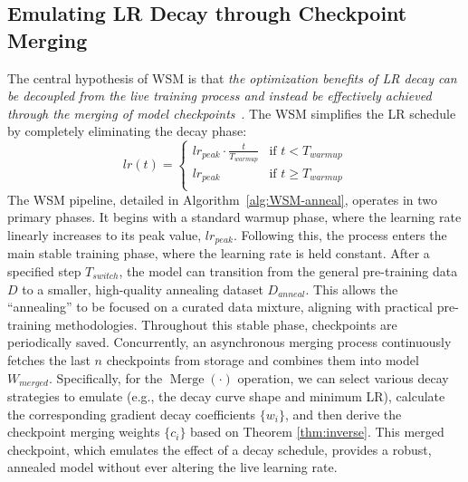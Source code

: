 \subsection{Emulating LR Decay through Checkpoint Merging}
The central hypothesis of WSM is that \textit{the optimization benefits of LR decay can be decoupled from the live training process and instead be effectively achieved through the merging of model checkpoints}~\citep{adam,deepseekv3,pma}.
The WSM simplifies the LR schedule by completely eliminating the decay phase:
\[
lr(t) = \begin{cases}
lr_{peak} \cdot \frac{t}{T_{warmup}} & \text{if } t < T_{warmup} \\
lr_{peak} & \text{if } t \ge T_{warmup}  \\
\end{cases}
\]
The WSM pipeline, detailed in Algorithm~\ref{alg:WSM-anneal}, operates in two primary phases. It begins with a standard warmup phase, where the learning rate linearly increases to its peak value, $lr_{peak}$. Following this, the process enters the main stable training phase, where the learning rate is held constant. After a specified step $T_{switch}$, the model can transition from the general pre-training data $D$ to a smaller, high-quality annealing dataset $D_{anneal}$. This allows the ``annealing'' to be focused on a curated data mixture, aligning with practical pre-training methodologies. Throughout this stable phase, checkpoints are periodically saved. Concurrently, an asynchronous merging process continuously fetches the last $n$ checkpoints from storage and combines them into model $W_{merged}$. Specifically, for the $\operatorname{Merge}(\cdot)$ operation, we can select various decay strategies to emulate (e.g., the decay curve shape and minimum LR), calculate the corresponding gradient decay coefficients $\{w_i\}$, and then derive the checkpoint merging weights $\{c_i\}$ based on Theorem \ref{thm:inverse}. This merged checkpoint, which emulates the effect of a decay schedule, provides a robust, annealed model without ever altering the live learning rate.



